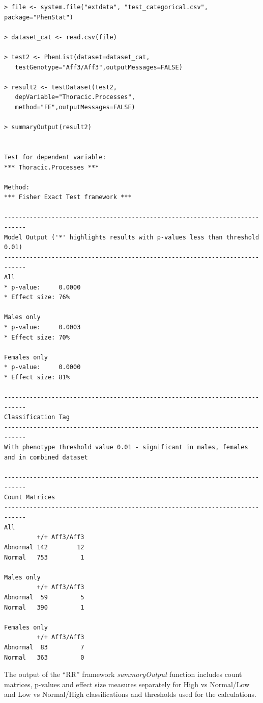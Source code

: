 \documentclass[12pt,a4paper]{article}
\begin{document}
\begingroup
    \fontsize{8pt}{12pt}\selectfont
\begin{verbatim}
> file <- system.file("extdata", "test_categorical.csv", package="PhenStat")
 
> dataset_cat <- read.csv(file)

> test2 <- PhenList(dataset=dataset_cat,
   testGenotype="Aff3/Aff3",outputMessages=FALSE)

> result2 <- testDataset(test2,
   depVariable="Thoracic.Processes",
   method="FE",outputMessages=FALSE)  

> summaryOutput(result2)


Test for dependent variable:
*** Thoracic.Processes ***

Method:
*** Fisher Exact Test framework ***

----------------------------------------------------------------------------
Model Output ('*' highlights results with p-values less than threshold 0.01)
----------------------------------------------------------------------------
All            
* p-value:     0.0000
* Effect size: 76%   

Males only       
* p-value:     0.0003
* Effect size: 70%   

Females only        
* p-value:     0.0000
* Effect size: 81%   

----------------------------------------------------------------------------
Classification Tag
----------------------------------------------------------------------------
With phenotype threshold value 0.01 - significant in males, females and in combined dataset

----------------------------------------------------------------------------
Count Matrices
----------------------------------------------------------------------------
All
         +/+ Aff3/Aff3
Abnormal 142        12
Normal   753         1

Males only
         +/+ Aff3/Aff3
Abnormal  59         5
Normal   390         1

Females only
         +/+ Aff3/Aff3
Abnormal  83         7
Normal   363         0
\end{verbatim}
\endgroup

The output of the “RR” framework \textit{summaryOutput} function includes count matrices, p-values and effect size measures separately for High vs Normal/Low and Low vs Normal/High classifications and thresholds used for the calculations.
\end{document}
